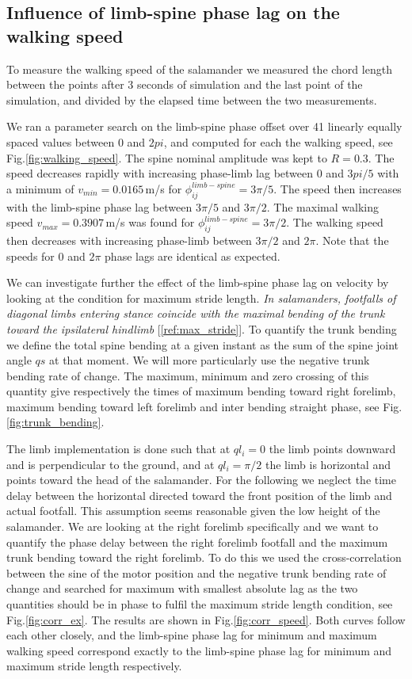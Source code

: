 \documentclass[a4paper]{scrartcl}
\begin{document}
{\subsection*{Influence of limb-spine phase lag on the walking speed}
To measure the walking speed of the salamander we measured the chord length between the points after 3 seconds of simulation and the last point of the simulation, and divided by the elapsed time between the two measurements.

We ran a parameter search on the limb-spine phase offset over 41 linearly equally spaced values between $0$ and $2pi$, and computed for each the walking speed, see Fig.\ref{fig:walking_speed}. The spine nominal amplitude was kept to $R=0.3$. The speed decreases rapidly with increasing phase-limb lag between $0$ and $3pi/5$ with a minimum of $v_{min} = 0.0165$\,m/s for $\phi_{ij}^{limb-spine} = 3\pi/5$. The speed then increases with the limb-spine phase lag between $3\pi/5$ and $3\pi/2$. The maximal walking speed $v_{max} = 0.3907$\,m/s was found for $\phi_{ij}^{limb-spine} = 3\pi/2$. The walking speed then decreases with increasing phase-limb between $3\pi/2$ and $2\pi$. Note that the speeds for $0$ and $2\pi$ phase lags are identical as expected.

We can investigate further the effect of the limb-spine phase lag on velocity by looking at the condition for maximum stride length. \textit{In salamanders, footfalls of diagonal limbs entering stance coincide with the maximal bending of the trunk toward the ipsilateral hindlimb} [\ref{ref:max_stride}]. To quantify the trunk bending we define the total spine bending at a given instant as the sum of the spine joint angle $qs$ at that moment. We will more particularly use the negative trunk bending rate of change. The maximum, minimum and zero crossing of this quantity give respectively the times of maximum bending toward right forelimb, maximum bending toward left forelimb and inter bending straight phase, see Fig.\ref{fig:trunk_bending}. 

The limb implementation is done such that at $ql_{i} = 0$ the limb points downward and is perpendicular to the ground, and at $ql_{i} = \pi/2$ the limb is horizontal and points toward the head of the salamander. For the following we neglect the time delay between the horizontal directed toward the front position of the limb and actual footfall. This assumption seems reasonable given the low height of the salamander. We are looking at the right forelimb specifically and we want to quantify the phase delay between the right forelimb footfall and the maximum trunk bending toward the right forelimb. To do this we used the cross-correlation between the sine of the motor position and the negative trunk bending rate of change and searched for maximum with smallest absolute lag as the two quantities should be in phase to fulfil the maximum stride length condition, see Fig.\ref{fig:corr_ex}. The results are shown in Fig.\ref{fig:corr_speed}. Both curves follow each other closely, and the limb-spine phase lag  for minimum and maximum walking speed correspond exactly to the limb-spine phase lag for minimum and maximum stride length respectively.

}
\end{document}
